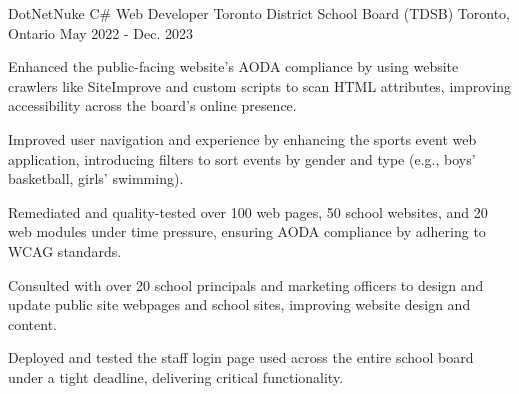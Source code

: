 \begin{cventries}
\cventry
  {DotNetNuke C\# Web Developer} %
  {Toronto District School Board (TDSB)} %
  {Toronto, Ontario} %
  {May 2022 - Dec. 2023} %
  {
    \begin{cvitems} %
      \item {Enhanced the public-facing website's AODA compliance by using website crawlers like SiteImprove and custom scripts to scan HTML attributes, improving accessibility across the board's online presence.}
      \item {Improved user navigation and experience by enhancing the sports event web application, introducing filters to sort events by gender and type (e.g., boys' basketball, girls' swimming).}
      \item {Remediated and quality-tested over 100 web pages, 50 school websites, and 20 web modules under time pressure, ensuring AODA compliance by adhering to WCAG standards.}
      \item {Consulted with over 20 school principals and marketing officers to design and update public site webpages and school sites, improving website design and content.}
      \item {Deployed and tested the staff login page used across the entire school board under a tight deadline, delivering critical functionality.}
    \end{cvitems}
  }



\end{cventries}

